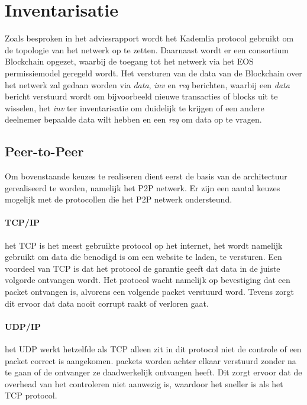 \section{Inventarisatie}

Zoals besproken in het adviesrapport wordt het Kademlia protocol gebruikt om de topologie van het netwerk op te zetten. Daarnaast wordt er een consortium Blockchain opgezet, waarbij de toegang tot het netwerk via het EOS permissiemodel geregeld wordt. Het versturen van de data van de Blockchain over het netwerk zal gedaan worden via \textit{data}, \textit{inv} en \textit{req} berichten, waarbij een \textit{data} bericht verstuurd wordt om bijvoorbeeld nieuwe transacties of blocks uit te wisselen, het \textit{inv} ter inventarisatie om duidelijk te krijgen of een andere deelnemer bepaalde data wilt hebben en een \textit{req} om data op te vragen.

\subsection{Peer-to-Peer}
Om bovenstaande keuzes te realiseren dient eerst de basis van de architectuur gerealiseerd te worden, namelijk het \acrfull{P2P} netwerk. Er zijn een aantal keuzes mogelijk met de protocollen die het \acrshort{P2P} netwerk ondersteund.

\paragraph{TCP/IP} het \acrfull{TCP} is het meest gebruikte protocol op het internet, het wordt namelijk gebruikt om data die benodigd is om een website te laden, te versturen. Een voordeel van \acrshort{TCP} is dat het protocol de garantie geeft dat data in de juiste volgorde ontvangen wordt. Het protocol wacht namelijk op bevestiging dat een \gls{packet} ontvangen is, alvorens een volgende \gls{packet} verstuurd word. Tevens zorgt dit ervoor dat data nooit corrupt raakt of verloren gaat.

\paragraph{UDP/IP} het \acrfull{UDP} werkt hetzelfde als \acrshort{TCP} alleen zit in dit protocol niet de controle of een \gls{packet} correct is aangekomen. \Glspl{packet} worden achter elkaar verstuurd zonder na te gaan of de ontvanger ze daadwerkelijk ontvangen heeft. Dit zorgt ervoor dat de overhead van het controleren niet aanwezig is, waardoor het sneller is als het \acrshort{TCP} protocol.

